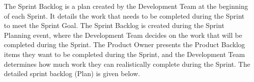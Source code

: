 \documentclass[12pt]{report}
\begin{document}
The Sprint Backlog is a plan created by the Development Team at the beginning of each Sprint. It details the work that needs to be completed during the Sprint to meet the Sprint Goal. The Sprint Backlog is created during the Sprint Planning event, where the Development Team decides on the work that will be completed during the Sprint. The Product Owner presents the Product Backlog items they want to be completed during the Sprint, and the Development Team determines how much work they can realistically complete during the Sprint. The detailed sprint backlog (Plan) is given below.
\newline

\begin{table}[h]
\LARGE
{}
\end{table}
\end{document}
